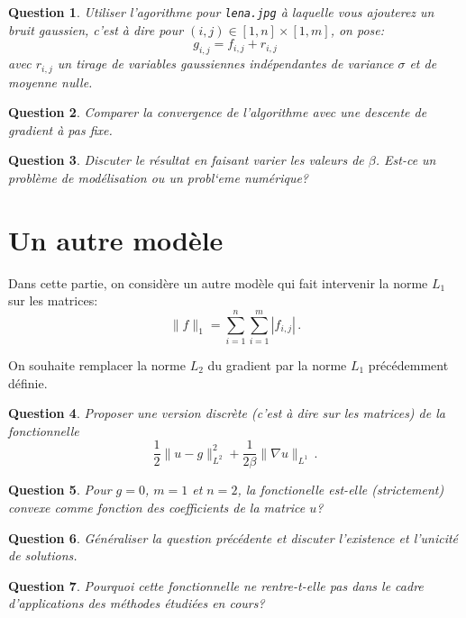 \documentclass[10pt,a4paper,fleqn]{report}
\newtheorem{question}{Question}
\begin{document}
\begin{question}
Utiliser l'agorithme pour \texttt{lena.jpg} \`a laquelle vous ajouterez un bruit gaussien, c'est \`a dire pour $ (i,j)\in [1,n]\times[1,m]$, on pose:
\begin{equation}
g_{i,j} = f_{i,j} + r_{i,j} 
\end{equation}
avec $r_{i,j}$ un tirage de variables gaussiennes ind\'ependantes de variance $\sigma$ et de moyenne nulle.
\end{question}

\begin{question}
Comparer la convergence de l'algorithme avec une descente de gradient \`a pas fixe.
\end{question}

\begin{question}
Discuter le r\'esultat en faisant varier les valeurs de $\beta$. Est-ce un probl\`eme de mod\'elisation ou un probl`eme num\'erique?
\end{question}


\section{Un autre mod\`ele}

Dans cette partie, on consid\`ere un autre mod\`ele qui fait intervenir la norme $L_1$ sur les matrices:
\begin{equation}
\| f \|_{1} = \sum_{i=1}^n \sum_{i=1}^m |f_{i,j}| \,.
\end{equation}

On souhaite remplacer la norme $L_2$ du gradient par la norme $L_1$ pr\'ec\'edemment d\'efinie.

\begin{question}
Proposer une version discr\`ete (c'est \`a dire sur les matrices) de la fonctionnelle $$ \frac12 \| u -  g\|^2_{L^2} + \frac{1}{2\beta}\| \nabla u \|_{L^1}\,.$$
\end{question}

\begin{question}
Pour $g=0$, $m=1$ et $n=2$, la fonctionelle est-elle (strictement) convexe comme fonction des coefficients de la matrice $u$?
\end{question}

\begin{question}
G\'en\'eraliser la question pr\'ec\'edente et discuter l'existence et l'unicit\'e de solutions.
\end{question}

\begin{question}
Pourquoi cette fonctionnelle ne rentre-t-elle pas dans le cadre d'applications des m\'ethodes \'etudi\'ees en cours?
\end{question}
\end{document}
